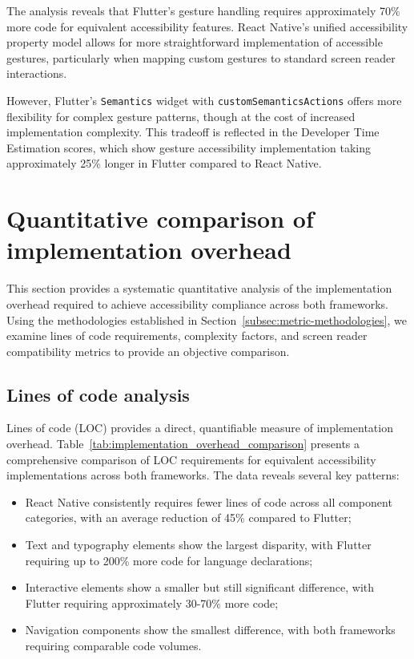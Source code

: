 The analysis reveals that Flutter's gesture handling requires approximately 70\% more code for equivalent accessibility features. React Native's unified accessibility property model allows for more straightforward implementation of accessible gestures, particularly when mapping custom gestures to standard screen reader interactions.

However, Flutter's \texttt{Semantics} widget with \texttt{customSemanticsActions} offers more flexibility for complex gesture patterns, though at the cost of increased implementation complexity. This tradeoff is reflected in the Developer Time Estimation scores, which show gesture accessibility implementation taking approximately 25\% longer in Flutter compared to React Native.

\section{Quantitative comparison of implementation overhead}
\label{sec:quantitative-comparison}

This section provides a systematic quantitative analysis of the implementation overhead required to achieve accessibility compliance across both frameworks. Using the methodologies established in Section~\ref{subsec:metric-methodologies}, we examine lines of code requirements, complexity factors, and screen reader compatibility metrics to provide an objective comparison.

\subsection{Lines of code analysis}
\label{subsec:loc-analysis}

Lines of code (LOC) provides a direct, quantifiable measure of implementation overhead. Table~\ref{tab:implementation_overhead_comparison} presents a comprehensive comparison of LOC requirements for equivalent accessibility implementations across both frameworks. The data reveals several key patterns:

\begin{itemize}
    \item React Native consistently requires fewer lines of code across all component categories, with an average reduction of 45\% compared to Flutter;
    \item Text and typography elements show the largest disparity, with Flutter requiring up to 200\% more code for language declarations;
    \item Interactive elements show a smaller but still significant difference, with Flutter requiring approximately 30-70\% more code;
    \item Navigation components show the smallest difference, with both frameworks requiring comparable code volumes.
\end{itemize}

